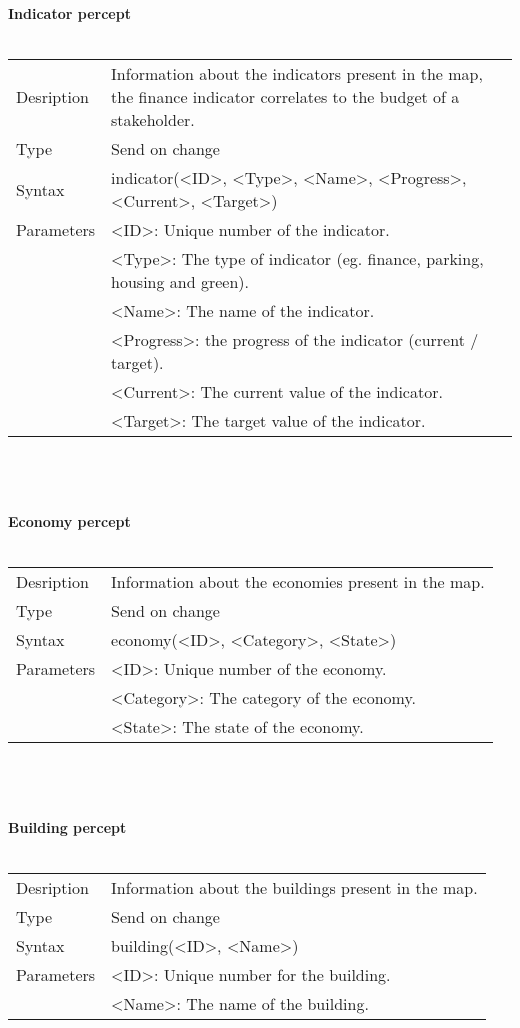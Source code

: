 \documentclass[english,11pt]{report}
\begin{document}
\textbf{Indicator percept}\\
\\
\begin{tabularx}{\textwidth}{lX}
 Desription & Information about the indicators present in the map, the finance indicator correlates to the budget of a stakeholder. \\
 Type & Send on change \\
 Syntax & indicator(<ID>, <Type>, <Name>, <Progress>, <Current>, <Target>) \\
 Parameters &   <ID>: Unique number of the indicator.\\
            &   <Type>: The type of indicator (eg. finance, parking, housing and green).\\
            &   <Name>: The name of the indicator.\\
            &   <Progress>: the progress of the indicator (current / target).\\
            &   <Current>: The current value of the indicator.\\
            &   <Target>: The target value of the indicator.
\end{tabularx}\\
\\
\\
\textbf{Economy percept}\\
\\
\begin{tabularx}{\textwidth}{lX}
 Desription & Information about the economies present in the map. \\
 Type & Send on change \\
 Syntax & economy(<ID>, <Category>, <State>) \\
 Parameters &   <ID>: Unique number of the economy.\\
            &   <Category>: The category of the economy.\\
            &   <State>: The state of the economy.
\end{tabularx}\\
\\
\\
\textbf{Building percept}\\
\\
\begin{tabularx}{\textwidth}{lX}
 Desription & Information about the buildings present in the map. \\
 Type & Send on change \\
 Syntax & building(<ID>, <Name>) \\
 Parameters &   <ID>: Unique number for the building.\\
            &   <Name>: The name of the building.
\end{tabularx}
\end{document}
